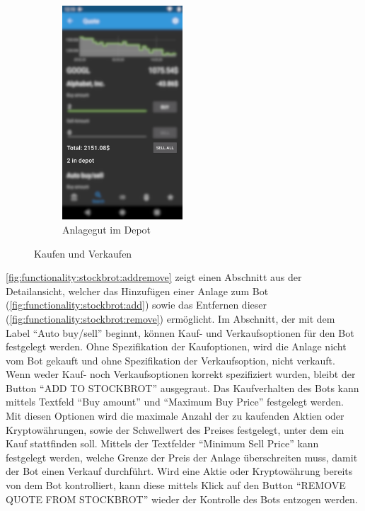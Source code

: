 \documentclass[a4paper]{article}
\begin{document}
\begin{figure}[H]
\begin{subfigure}{.5\textwidth}
		\centering
		\includegraphics[height=8cm,keepaspectratio]{./images/quote/in_depot.png}
		\caption{Anlagegut im Depot}
		\label{fig:functionality:buy-sell:in-depot}
	\end{subfigure}
	\caption{Kaufen und Verkaufen}
	\label{fig:functionality:buy-sell}
\end{figure}

\autoref{fig:functionality:stockbrot:addremove} zeigt einen Abschnitt aus der Detailansicht, welcher das Hinzufügen einer Anlage zum Bot (\autoref{fig:functionality:stockbrot:add}) sowie das Entfernen dieser (\autoref{fig:functionality:stockbrot:remove}) ermöglicht. Im Abschnitt, der mit dem Label "`Auto buy/sell"' beginnt, können Kauf- und Verkaufsoptionen für den Bot festgelegt werden. Ohne Spezifikation der Kaufoptionen, wird die Anlage nicht vom Bot gekauft und ohne Spezifikation der Verkaufsoption, nicht verkauft. Wenn weder Kauf- noch Verkaufsoptionen korrekt spezifiziert wurden, bleibt der Button "`ADD TO STOCKBROT"' ausgegraut. Das Kaufverhalten des Bots kann mittels Textfeld "`Buy amount"' und "`Maximum Buy Price"' festgelegt werden. Mit diesen Optionen wird die maximale Anzahl der zu kaufenden Aktien oder Kryptowährungen, sowie der Schwellwert des Preises festgelegt, unter dem ein Kauf stattfinden soll. Mittels der Textfelder "`Minimum Sell Price"' kann festgelegt werden, welche Grenze der Preis der Anlage überschreiten muss, damit der Bot einen Verkauf durchführt. Wird eine Aktie oder Kryptowährung bereits von dem Bot kontrolliert, kann diese mittels Klick auf den Button "`REMOVE QUOTE FROM STOCKBROT"' wieder der Kontrolle des Bots entzogen werden.
\end{document}
